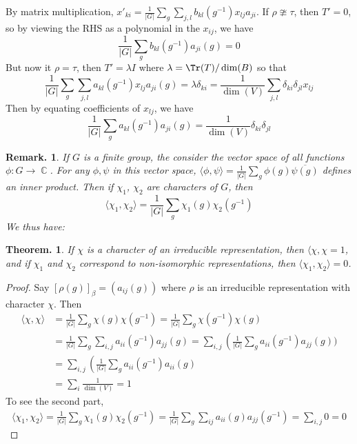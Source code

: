 \documentclass[11pt, a4paper]{memoir}
\DeclareMathOperator{\C}{{\mathbb{C}}}
\theoremstyle{change}
\newtheorem{theorem}{Theorem.}[section]
\theoremstyle{plain}
\theoremstyle{nonumberplain}
\newtheorem{remark}{Remark.}
\newtheorem{proof}{Proof}
\numberwithin{equation}{section}
\begin{document}
By matrix multiplication, $x'_{ki}=\frac{1}{|G|}\sum_g\sum_{j,l}b_{kl}(g^{-1})x_{lj}a_{ji}$.
If $\rho\ncong\tau$, then $T'=0$, so by viewing the RHS as a polynomial in the $x_{ij}$, we have
\begin{equation*}
    \frac{1}{|G|}\sum_g b_{kl}(g^{-1})a_{ji}(g)=0
\end{equation*}
But now it $\rho=\tau$, then $T'=\lambda I$ where $\lambda=\Tr(T)/\dim(B)$ so that
\begin{equation*}
    \frac{1}{|G|}\sum_g\sum_{j,l}a_{kl}(g^{-1})x_{lj}a_{ji}(g) = \lambda\delta_{ki}=\frac{1}{\dim(V)}\sum_{j,l}\delta_{ki}\delta_{jl}x_{lj}
\end{equation*}
Then by equating coefficients of $x_{lj}$, we have
\begin{equation*}
    \frac{1}{|G|}\sum_g a_{kl}(g^{-1})a_{ji}(g)=\frac{1}{\dim(V)}\delta_{ki}\delta_{jl}
\end{equation*}
\begin{remark}
    If $G$ is a finite group, the consider the vector space of all functions $\phi:G\to\C$.
    For any $\phi,\psi$ in this vector space, $\langle\phi,\psi\rangle=\frac{1}{|G|}\sum_g\phi(g)\overline{\psi(g)}$ defines an inner product.
    Then if $\chi_1$, $\chi_2$ are characters of $G$, then
    \begin{equation*}
        \langle\chi_1,\chi_2\rangle=\frac{1}{|G|}\sum_g\chi_1(g)\chi_2(g^{-1})
    \end{equation*}
    We thus have:
\end{remark}
\begin{theorem}
    If $\chi$ is a character of an irreducible representation, then $\langle{\chi,\chi}=1$, and if $\chi_1$ and $\chi_2$ correspond to non-isomorphic representations, then $\langle\chi_1,\chi_2\rangle=0$.
\end{theorem}
\begin{proof}
    Say $[\rho(g)]_\beta=(a_{ij}(g))$ where $\rho$ is an irreducible representation with character $\chi$.
    Then
    \begin{align*}
        \langle\chi,\chi\rangle &= \frac{1}{|G|}\sum_g\chi(g)\chi(g^{-1}) = \frac{1}{|G|}\sum_g\chi(g^{-1})\chi(g)\\
                                &= \frac{1}{|G|}\sum_g\sum_{i,j}a_{ii}(g^{-1})a_{jj}(g) = \sum_{i,j}\left(\frac{1}{|G|}\sum_g a_{ii}(g^{-1})a_{jj}(g))\\
                                &= \sum_{i,j}\left(\frac{1}{|G|}\sum_g a_{ii}(g^{-1})a_{ii}(g)\\
                                &= \sum_i\frac{1}{\dim(V)} = 1
    \end{align*}
    To see the second part,
    \begin{align*}
        \langle\chi_1,\chi_2\rangle = \frac{1}{|G|}\sum_g\chi_1(g)\chi_2(g^{-1}) = \frac{1}{|G|}\sum_g\sum_{ij} a_{ii}(g)a_{jj}(g^{-1}) = \sum_{i,j}0=0
    \end{align*}
\end{proof}
\end{document}
